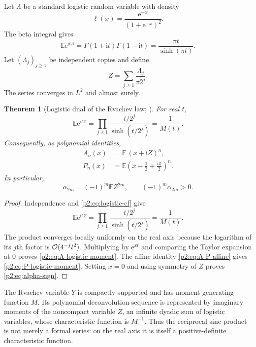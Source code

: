 \documentclass[11pt,oneside]{article}
\numberwithin{equation}{section}
\newtheorem{theorem}{Theorem}[section]
\theoremstyle{definition}
\theoremstyle{remark}
\newcommand{\e}{\mathrm e}
\newcommand{\ii}{\mathrm i}
\begin{document}
Let $\Lambda$ be a standard logistic random variable with density
\begin{equation}
 \ell(x)=\frac{\e^{-x}}{(1+\e^{-x})^2}.
 \label{p2:eq:logistic-density}
\end{equation}
The beta integral gives
\begin{equation}
 \mathbb E\e^{\ii t\Lambda}
 =\Gamma(1+\ii t)\Gamma(1-\ii t)
 =\frac{\pi t}{\sinh(\pi t)}.
 \label{p2:eq:logistic-cf}
\end{equation}
Let $(\Lambda_j)_{j\ge1}$ be independent copies and define
\begin{equation}
 Z=\sum_{j\ge1}\frac{\Lambda_j}{\pi2^j}.
 \label{p2:eq:Z-logistic}
\end{equation}
The series converges in $L^2$ and almost surely.

\begin{theorem}[Logistic dual of the Rvachev law; \statusnew]
\label{p2:thm:logistic-dual}
For real $t$,
\begin{equation}
 \boxed{
 \mathbb E\e^{\ii tZ}
 =\prod_{j\ge1}\frac{t/2^j}{\sinh(t/2^j)}
 =\frac1{M(t)}.
 }
 \label{p2:eq:Z-cf}
\end{equation}
Consequently, as polynomial identities,
\begin{align}
 A_n(x)&=\mathbb E\,(x+\ii Z)^n,
 \label{p2:eq:A-logistic-moment}\\
 P_n(x)&=\mathbb E\left(x-\frac12+\frac{\ii Z}{2}\right)^n.
 \label{p2:eq:P-logistic-moment}
\end{align}
In particular,
\begin{equation}
 \boxed{
 \alpha_{2m}=(-1)^m\mathbb E Z^{2m},
 \qquad (-1)^m\alpha_{2m}>0.
 }
 \label{p2:eq:alpha-sign}
\end{equation}
\end{theorem}

\begin{proof}
Independence and \eqref{p2:eq:logistic-cf} give
\[
 \mathbb E\e^{\ii tZ}
 =\prod_{j\ge1}
 \frac{t/2^j}{\sinh(t/2^j)}=\frac1{M(t)}.
\]
The product converges locally uniformly on the real axis because the logarithm of its $j$th factor
is $\mathcal O(4^{-j}t^2)$.  Multiplying by $\e^{xt}$ and comparing the Taylor expansion at $0$ proves
\eqref{p2:eq:A-logistic-moment}.  The affine identity \eqref{p2:eq:A-P-affine} gives
\eqref{p2:eq:P-logistic-moment}.  Setting $x=0$ and using symmetry of $Z$ proves
\eqref{p2:eq:alpha-sign}.
\end{proof}

\begin{resultbox}
The Rvachev variable $Y$ is compactly supported and has moment generating function $M$.  Its
polynomial deconvolution sequence is represented by imaginary moments of the noncompact variable
$Z$, an infinite dyadic sum of logistic variables, whose characteristic function is $M^{-1}$.
Thus the reciprocal sinc product is not merely a formal series: on the real axis it is itself a
positive-definite characteristic function.
\end{resultbox}
\end{document}
